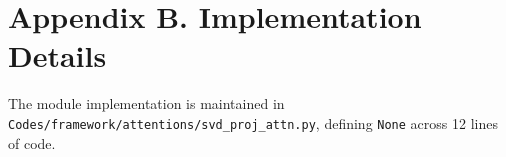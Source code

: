 \section*{Appendix B. Implementation Details}
The module implementation is maintained in \texttt{Codes/framework/attentions/svd\_proj\_attn.py}, defining \texttt{None} across 12 lines of code.
